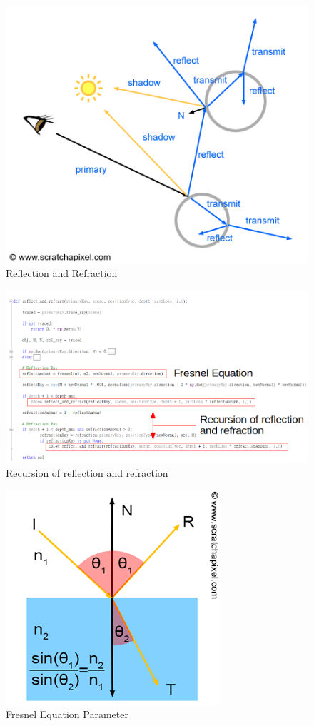 \documentclass[a4paper, 12pt]{article}
\begin{document}
\begin{figure}[H]
\centering
\includegraphics[width=0.8\linewidth]{rt-recursive.png}
\caption{Reflection and Refraction}
\label{fig:Reflection and Refraction}
\end{figure}
\begin{figure}[H]
\centering
\includegraphics[width=\linewidth]{Reflect_and_refraction.png}
\caption{Recursion of reflection and refraction}
\label{fig:Recursion of reflection and refraction}
\end{figure}
\begin{figure}[H]
\centering
\includegraphics[scale=0.6]{shad-refraction6.png}
\caption{Fresnel Equation Parameter}
\label{fig:Fresnel Equation Parameter}
\end{figure}  
\end{document}
